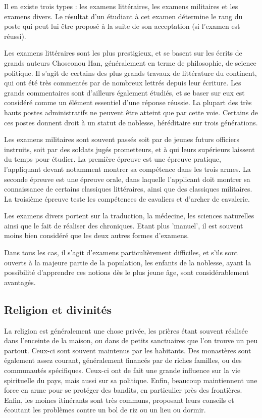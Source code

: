 \documentclass[10pt,a4paper]{book}
\newcommand{\nomroyaume}{Choseon}
\begin{document}
Il en existe trois types : les examens littéraires, les examens militaires et les examens divers. Le résultat d'un étudiant à cet examen détermine le rang du poste qui peut lui être proposé à la suite de son acceptation (si l'examen est réussi).

Les examens littéraires sont les plus prestigieux, et se basent sur les écrits de grands auteurs \nomroyaume ou Han, généralement en terme de philosophie, de science politique. Il s'agit de certains des plus grands travaux de littérature du continent, qui ont été très commentés par de nombreux lettrés depuis leur écriture. Les grands commentaires sont d'ailleurs également étudiés, et se baser sur eux est considéré comme un élément essentiel d'une réponse réussie. La plupart des très hauts postes administratifs ne peuvent être atteint que par cette voie. Certains de ces postes donnent droit à un statut de noblesse, héréditaire sur trois générations.

Les examens militaires sont souvent passés soit par de jeunes futurs officiers instruits, soit par des soldats jugés prometteurs, et à qui leurs supérieurs laissent du temps pour étudier. La première épreuve est une épreuve pratique, l'appliquant devant notamment montrer sa compétence dans les trois armes. La seconde épreuve est une épreuve orale, dans laquelle l'applicant doit montrer sa connaissance de certains classiques littéraires, ainsi que des classiques militaires. La troisième épreuve teste les compétences de cavaliers et d'archer de cavalerie.

Les examens divers portent sur la traduction, la médecine, les sciences naturelles ainsi que le fait de réaliser des chroniques. Etant plus 'manuel', il est souvent moins bien considéré que les deux autres formes d'examens.

Dans tous les cas, il s'agit d'examens particulièrement difficiles, et s'ils sont ouverts à la majeure partie de la population, les enfants de la noblesse, ayant la possibilité d'apprendre ces notions dès le plus jeune âge, sont considérablement avantagés. 
\subsection{Religion et divinités}
La religion est généralement une chose privée, les prières étant souvent réalisée dans l'enceinte de la maison, ou dans de petits sanctuaires que l'on trouve un peu partout. Ceux-ci sont souvent maintenus par les habitants. Des monastères sont également assez courant, généralement financés par de riches familles, ou des communautés spécifiques. Ceux-ci ont de fait une grande influence sur la vie spirituelle du pays, mais aussi sur sa politique. Enfin, beaucoup maintiennent une force en arme pour se protéger des bandits, en particulier près des frontières. Enfin, les moines itinérants sont très communs, proposant leurs conseils et écoutant les problèmes contre un bol de riz ou un lieu ou dormir.
\end{document}
